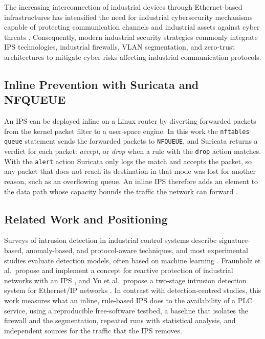 The increasing interconnection of industrial devices through Ethernet-based infrastructures has intensified the need for industrial cybersecurity mechanisms capable of protecting communication channels and industrial assets against cyber threats \cite{Lin2021Protocols}. Consequently, modern industrial security strategies commonly integrate IPS technologies, industrial firewalls, VLAN segmentation, and zero-trust architectures to mitigate cyber risks affecting industrial communication protocols.

\subsection{Inline Prevention with Suricata and NFQUEUE}
An IPS can be deployed inline on a Linux router by diverting forwarded packets from the kernel packet filter to a user-space engine. In this work the \texttt{nftables} \texttt{queue} statement sends the forwarded packets to \texttt{NFQUEUE}, and Suricata returns a verdict for each packet: \emph{accept}, or \emph{drop} when a rule with the \texttt{drop} action matches. With the \texttt{alert} action Suricata only logs the match and accepts the packet, so any packet that does not reach its destination in that mode was lost for another reason, such as an overflowing queue. An inline IPS therefore adds an element to the data path whose capacity bounds the traffic the network can forward \cite{fraunholz2018industrial}.

\subsection{Related Work and Positioning}
Surveys of intrusion detection in industrial control systems \cite{Liao2013IDS,Bhamare2020ICS,ahmed2019survey} describe signature-based, anomaly-based, and protocol-aware techniques, and most experimental studies evaluate detection models, often based on machine learning \cite{Tama2022IDS,Raman2021ICS}. Fraunholz et al.\ propose and implement a concept for reactive protection of industrial networks with an IPS \cite{fraunholz2018industrial}, and Yu et al.\ propose a two-stage intrusion detection system for Ethernet/IP networks \cite{Yu2019IDS}. In contrast with detection-centred studies, this work measures what an inline, rule-based IPS does to the availability of a PLC service, using a reproducible free-software testbed, a baseline that isolates the firewall and the segmentation, repeated runs with statistical analysis, and independent sources for the traffic that the IPS removes.
